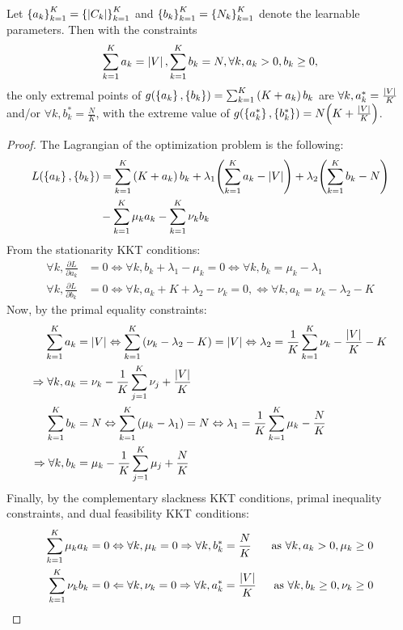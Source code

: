 \begin{lemma}
    \label{lemma:kkt_evaluation_cost}
    Let $\mathopen{}\left\{a_k\right\}_{k=1}^{K}=\mathopen{}\left\{\mathopen{}\left|C_k\right|\right\}_{k=1}^{K}$ and $\mathopen{}\left\{b_k\right\}_{k=1}^{K}=\mathopen{}\left\{N_k\right\}_{k=1}^{K}$ denote the learnable parameters. Then with the constraints $$\sum_{k=1}^{K}{a_k}=\mathopen{}\left|V\right|, \sum_{k=1}^{K}{b_k}=N, \forall k, a_k > 0, b_k \geq 0,$$ the only extremal points of $g\mathopen{}\left(\mathopen{}\left\{a_k\right\},\mathopen{}\left\{b_k\right\}\right)=\sum_{k=1}^{K}{\mathopen{}\left(K + a_k\right)b_k}$ are $\forall k, a^*_k = \frac{\mathopen{}\left|V\right|}{K}$ and/or $\forall k, b^*_k = \frac{N}{K}$, with the extreme value of $g\mathopen{}\left(\mathopen{}\left\{a^*_k\right\},\mathopen{}\left\{b^*_k\right\}\right)=N\mathopen{}\left(K + \frac{\mathopen{}\left|V\right|}{K}\right)$.
\end{lemma}
    \begin{proof}
        The Lagrangian of the optimization problem is the following:
        \begin{align*}
             L\mathopen{}\left(\mathopen{}\left\{a_k\right\},\mathopen{}\left\{b_k\right\}\right) &= \sum_{k=1}^{K}{\mathopen{}\left(K + a_k\right)b_k} + \lambda_1 \mathopen{}\left(\sum_{k=1}^{K}{a_k} - \mathopen{}\left|V\right|\right) + \lambda_2 \mathopen{}\left(\sum_{k=1}^{K}{b_k} - N\right) \\
             &- \sum_{k=1}^{K}{\mu_k a_k} - \sum_{k=1}^{K}{\nu_k b_k}
        \end{align*}
        $$$$
    From the stationarity KKT conditions:
    \begin{align*}
        \forall k, \frac{\partial L}{\partial a_k} &= 0 \Leftrightarrow \forall k, b_k + \lambda_1 - \mu_k = 0 \Leftrightarrow  \forall k, b_k = \mu_k - \lambda_1 \\
        \forall k, \frac{\partial L}{\partial b_k} &= 0 \Leftrightarrow \forall k, a_k + K + \lambda_2 - \nu_k = 0, \Leftrightarrow \forall k, a_k = \nu_k - \lambda_2 - K
    \end{align*}
    Now, by the primal equality constraints:
    \begin{align*}
        \sum_{k=1}^{K}{a_k} &= \mathopen{}\left|V\right| \Leftrightarrow \sum_{k=1}^{K}{\mathopen{}\left(\nu_k - \lambda_2 - K\right)} = \mathopen{}\left|V\right| \Leftrightarrow \lambda_2 = \frac{1}{K} \sum_{k=1}^{K}{\nu_k} - \frac{\mathopen{}\left|V\right|}{K} - K \\
        \Rightarrow \forall k, a_k &= \nu_k - \frac{1}{K} \sum_{j=1}^{K}{\nu_j} + \frac{\mathopen{}\left|V\right|}{K} \\
        \sum_{k=1}^{K}{b_k} &= N \Leftrightarrow \sum_{k=1}^{K}{\mathopen{}\left(\mu_k - \lambda_1\right)} = N \Leftrightarrow \lambda_1 = \frac{1}{K} \sum_{k=1}^{K}{\mu_k} - \frac{N}{K} \\
        \Rightarrow \forall k, b_k &= \mu_k - \frac{1}{K} \sum_{j=1}^{K}{\mu_j} + \frac{N}{K}
    \end{align*}
    Finally, by the complementary slackness KKT conditions, primal inequality constraints, and dual feasibility KKT conditions:
    \begin{align*}
        \sum_{k=1}^{K}{\mu_k a_k} &= 0 \Leftrightarrow \forall k, \mu_k = 0 \Rightarrow \forall k, b^*_k=\frac{N}{K} & \text{ as $\forall k, a_k>0,\mu_k \geq 0$}\\
        \sum_{k=1}^{K}{\nu_k b_k} &= 0 \Leftarrow \forall k, \nu_k = 0 \Rightarrow \forall k, a^*_k = \frac{\mathopen{}\left|V\right|}{K} & \text{ as $\forall k, b_k \geq 0,\nu_k \geq 0$}
    \end{align*}
    \end{proof}

